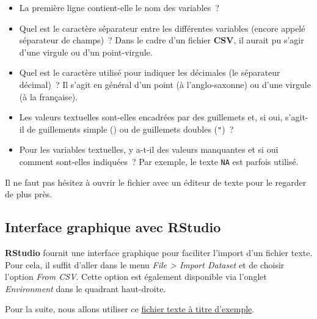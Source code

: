 \documentclass[
  letterpaper,
  DIV=11,
  numbers=noendperiod,
  oneside]{scrreprt}
\providecommand{\tightlist}{%
  \setlength{\itemsep}{0pt}\setlength{\parskip}{0pt}}\usepackage{longtable,booktabs,array}
\begin{document}
\begin{itemize}
\tightlist
\item
  La première ligne contient-elle le nom des variables~?
\item
  Quel est le caractère séparateur entre les différentes variables
  (encore appelé séparateur de champs)~? Dans le cadre d'un fichier
  \textbf{CSV}, il aurait pu s'agir d'une virgule ou d'un point-virgule.
\item
  Quel est le caractère utilisé pour indiquer les décimales (le
  séparateur décimal)~? Il s'agit en général d'un point (à
  l'anglo-saxonne) ou d'une virgule (à la française).
\item
  Les valeurs textuelles sont-elles encadrées par des guillemets et, si
  oui, s'agit-il de guillements simple (\texttt{\textquotesingle{}}) ou
  de guillemets doubles (\texttt{"})~?
\item
  Pour les variables textuelles, y a-t-il des valeurs manquantes et si
  oui comment sont-elles indiquées~? Par exemple, le texte \texttt{NA}
  est parfois utilisé.
\end{itemize}

Il ne faut pas hésitez à ouvrir le fichier avec un éditeur de texte pour
le regarder de plus près.

\hypertarget{interface-graphique-avec-rstudio}{%
\subsection{Interface graphique avec
RStudio}\label{interface-graphique-avec-rstudio}}

\textbf{RStudio} fournit une interface graphique pour faciliter l'import
d'un fichier texte. Pour cela, il suffit d'aller dans le menu \emph{File
\textgreater{} Import Dataset} et de choisir l'option \emph{From
CSV}. Cette option est également disponible via l'onglet
\emph{Environment} dans le quadrant haut-droite.

Pour la suite, nous allons utiliser ce
\href{ressources/exemple_texte_tabule.txt}{fichier texte à titre
d'exemple}.
\end{document}
